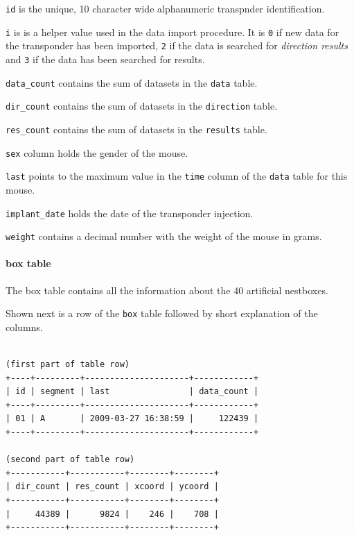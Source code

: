 \begin{mydesc}
	\item \lstinline|id| is the unique, 10 character wide alphanumeric transpnder identification.
	\item \lstinline|i| is is a helper value used in the data import procedure. It is \lstinline|0| if new data for the transponder has been imported, \lstinline|2| if the data is searched for \textit{direction results} and \lstinline|3| if the data has been searched for results.
	\item \lstinline|data_count| contains the sum of datasets in the \lstinline|data| table.
	\item \lstinline|dir_count| contains the sum of datasets in the \lstinline|direction| table.
	\item \lstinline|res_count| contains the sum of datasets in the \lstinline|results| table.
	\item \lstinline|sex| column holds the gender of the mouse.
	\item \lstinline|last| points to the maximum value in the \lstinline|time| column of the \lstinline|data| table for this mouse. 
	\item \lstinline|implant_date| holds the date of the transponder injection.
	\item \lstinline|weight| contains a decimal number with the weight of the mouse in grams.
\end{mydesc}

\paragraph{box table}
\label{para:box_table}

The box table contains all the information about the 40 artificial nestboxes. 

Shown next is a row of the \lstinline|box| table followed by short explanation of the columns.
\codescript
\begin{lstlisting}[frame=none]

(first part of table row)
+----+---------+---------------------+------------+
| id | segment | last                | data_count |
+----+---------+---------------------+------------+
| 01 | A       | 2009-03-27 16:38:59 |     122439 | 
+----+---------+---------------------+------------+

(second part of table row)
+-----------+-----------+--------+--------+
| dir_count | res_count | xcoord | ycoord |
+-----------+-----------+--------+--------+
|     44389 |      9824 |    246 |    708 | 
+-----------+-----------+--------+--------+

\end{lstlisting}

